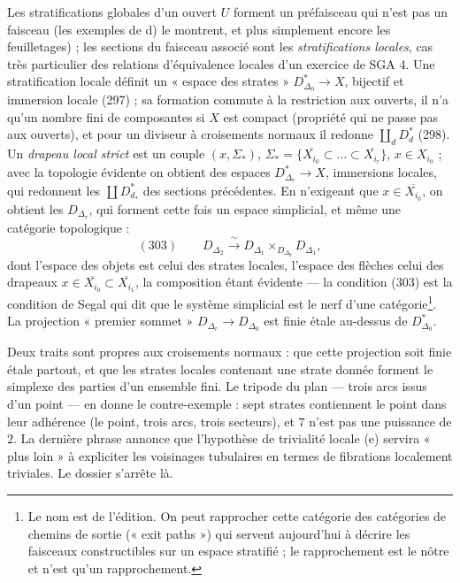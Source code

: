 \documentclass[11pt,a4paper]{article}
\begin{document}
\begin{center}
\end{center}

Les stratifications globales d'un ouvert $U$ forment un préfaisceau qui n'est pas
un faisceau (les exemples de d) le montrent, et plus simplement encore les
feuilletages) ; les sections du faisceau associé sont les \emph{stratifications
locales}, cas très particulier des relations d'équivalence locales d'un exercice
de SGA 4. Une stratification locale définit un « espace des strates » $D^{*}_{\Delta_0}
\to X$, bijectif et immersion locale (297) ; sa formation commute à la
restriction aux ouverts, il n'a qu'un nombre fini de composantes si $X$ est
compact (propriété qui ne passe pas aux ouverts), et pour un diviseur à
croisements normaux il redonne $\coprod_d D^{*}_d$ (298). Un \emph{drapeau local strict} est un
couple $(x, \Sigma_*)$, $\Sigma_* = \{\overline{X_{i_0}} \subset \dots \subset
\overline{X_{i_r}}\}$, $x \in X_{i_0}$ ; avec la topologie évidente on obtient des
espaces $D^{*}_{\Delta_r} \to X$, immersions locales, qui redonnent les
$\coprod D^{*}_{d_*}$ des sections précédentes. En n'exigeant que $x \in
\overline{X_{i_0}}$, on obtient les $D_{\Delta_r}$, qui forment cette fois un
espace simplicial, et même une catégorie topologique :
\[
(303) \qquad D_{\Delta_2} \xrightarrow{\ \sim\ } D_{\Delta_1} \times_{D_{\Delta_0}}
D_{\Delta_1},
\]
dont l'espace des objets est celui des strates locales, l'espace des flèches celui
des drapeaux $x \in \overline{X_{i_0}} \subset \overline{X_{i_1}}$, la composition
étant évidente — la condition (303) est la condition de Segal qui dit que le
système simplicial est le nerf d'une catégorie\footnote{Le nom est de l'édition.
On peut rapprocher cette catégorie des catégories de chemins de sortie
(« exit paths ») qui servent aujourd'hui à décrire les faisceaux constructibles
sur un espace stratifié ; le rapprochement est le nôtre et n'est qu'un
rapprochement.}. La projection « premier sommet » $D_{\Delta_r} \to D_{\Delta_0}$
est finie étale au-dessus de $D^{*}_{\Delta_0}$.

Deux traits sont propres aux croisements normaux : que cette projection soit finie
étale partout, et que les strates locales contenant une strate donnée forment le
simplexe des parties d'un ensemble fini. Le tripode du plan — trois arcs issus d'un
point — en donne le contre-exemple : sept strates contiennent le point dans leur
adhérence (le point, trois arcs, trois secteurs), et $7$ n'est pas une puissance
de $2$. La dernière phrase annonce que l'hypothèse de trivialité locale (e)
servira « plus loin » à expliciter les voisinages tubulaires en termes de
fibrations localement triviales. Le dossier s'arrête là.
\end{document}
